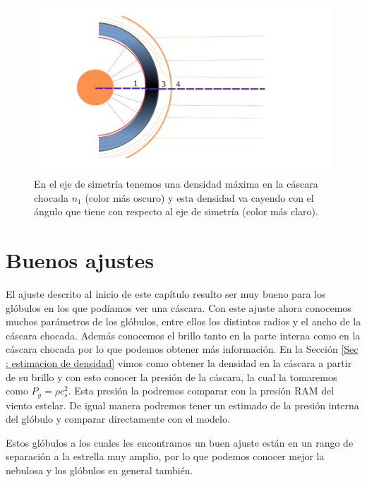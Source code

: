 \documentclass{book}
\begin{document}
\begin{figure}[htb]
    \centering    \includegraphics[width=\textwidth]{Nuevas imagenes finales/densi_angle.pdf}
    \caption{En el eje de simetría tenemos una densidad máxima en la cáscara chocada $n_1$ (color más oscuro) y esta densidad va cayendo con el ángulo que tiene con respecto al eje de simetría (color más claro).}
    \label{fig:dens_angl}
\end{figure}


\section{Buenos ajustes}\label{Good results}

El ajuste descrito al inicio de este capítulo resulto ser muy bueno para los glóbulos en los que podíamos ver una cáscara. Con este ajuste ahora conocemos muchos parámetros de los glóbulos, entre ellos los distintos radios y el ancho de la cáscara chocada. Además conocemos el brillo tanto en la parte interna como en la cáscara chocada por lo que podemos obtener más información. En la Sección \ref{Sec : estimacion de densidad} vimos como obtener la densidad en la cáscara a partir de su brillo y con esto conocer la presión de la cáscara, la cual la tomaremos como $P_g=\rho c_s^2$. Esta presión la podremos comparar con la presión RAM del viento estelar. De igual manera podremos tener un estimado de la presión interna del glóbulo y comparar directamente con el modelo.

Estos glóbulos a los cuales les encontramos un buen ajuste están en un rango de separación a la estrella muy amplio, por lo que podemos conocer mejor la nebulosa y los glóbulos en general también.
\end{document}
